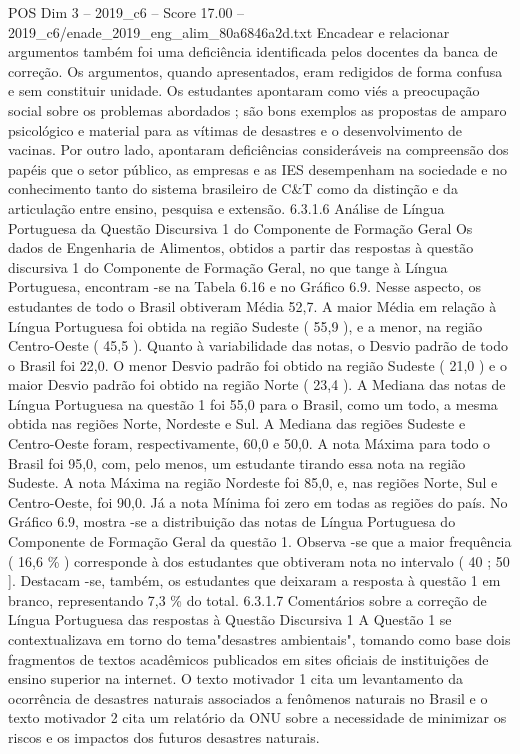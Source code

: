 \begin{textsample}{POS Dim 3 – 2019\_c6 – Score 17.00 – 2019\_c6/enade\_2019\_eng\_alim\_80a6846a2d.txt}
Encadear e relacionar argumentos também foi uma deficiência identificada pelos docentes da banca de correção.
Os argumentos, quando apresentados, eram redigidos de forma confusa e sem constituir unidade.
Os estudantes apontaram como viés a preocupação social sobre os problemas abordados ; são bons exemplos as propostas de amparo psicológico e material para as vítimas de desastres e o desenvolvimento de vacinas.
Por outro lado, apontaram deficiências consideráveis na compreensão dos papéis que o setor público, as empresas e as IES desempenham na sociedade e no conhecimento tanto do sistema brasileiro de C\&T como da distinção e da articulação entre ensino, pesquisa e extensão. 6.3.1.6 Análise de Língua Portuguesa da Questão Discursiva 1 do Componente de Formação Geral Os dados de Engenharia de Alimentos, obtidos a partir das respostas à questão discursiva 1 do Componente de Formação Geral, no que tange à Língua Portuguesa, encontram -se na Tabela 6.16 e no Gráfico 6.9.
Nesse aspecto, os estudantes de todo o Brasil obtiveram Média 52,7.
A maior Média em relação à Língua Portuguesa foi obtida na região Sudeste ( 55,9 ), e a menor, na região Centro-Oeste ( 45,5 ).
Quanto à variabilidade das notas, o Desvio padrão de todo o Brasil foi 22,0.
O menor Desvio padrão foi obtido na região Sudeste ( 21,0 ) e o maior Desvio padrão foi obtido na região Norte ( 23,4 ).
A Mediana das notas de Língua Portuguesa na questão 1 foi 55,0 para o Brasil, como um todo, a mesma obtida nas regiões Norte, Nordeste e Sul.
A Mediana das regiões Sudeste e Centro-Oeste foram, respectivamente, 60,0 e 50,0.
A nota Máxima para todo o Brasil foi 95,0, com, pelo menos, um estudante tirando essa nota na região Sudeste.
A nota Máxima na região Nordeste foi 85,0, e, nas regiões Norte, Sul e Centro-Oeste, foi 90,0.
Já a nota Mínima foi zero em todas as regiões do país.
No Gráfico 6.9, mostra -se a distribuição das notas de Língua Portuguesa do Componente de Formação Geral da questão 1.
Observa -se que a maior frequência ( 16,6 \% ) corresponde à dos estudantes que obtiveram nota no intervalo ( 40 ; 50 ].
Destacam -se, também, os estudantes que deixaram a resposta à questão 1 em branco, representando 7,3 \% do total. 6.3.1.7 Comentários sobre a correção de Língua Portuguesa das respostas à Questão Discursiva 1 A Questão 1 se contextualizava em torno do tema"desastres ambientais", tomando como base dois fragmentos de textos acadêmicos publicados em sites oficiais de instituições de ensino superior na internet.
O texto motivador 1 cita um levantamento da ocorrência de desastres naturais associados a fenômenos naturais no Brasil e o texto motivador 2 cita um relatório da ONU sobre a necessidade de minimizar os riscos e os impactos dos futuros desastres naturais.

\end{textsample}
